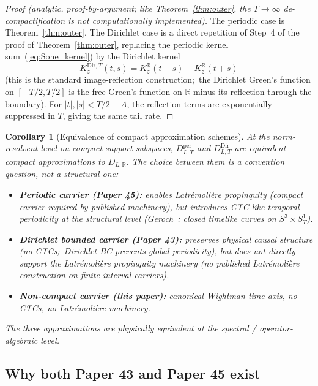 \documentclass[11pt,a4paper]{article}
\theoremstyle{plain}
\newtheorem{corollary}[theorem]{Corollary}
\theoremstyle{definition}
\newcommand{\sthree}{S^{3}}
\newcommand{\SoneT}{S^{1}_{T}}
\newcommand{\R}{\mathbb{R}}
\newcommand{\DLR}{D_{L,\R}}
\begin{document}
\begin{proof}[Proof (analytic, proof-by-argument; like
Theorem~\ref{thm:outer}, the $T\to\infty$ de-compactification is not
computationally implemented)]
The periodic case is Theorem~\ref{thm:outer}. The Dirichlet case is a
direct repetition of Step~4 of the proof of Theorem~\ref{thm:outer},
replacing the periodic kernel sum~(\ref{eq:Sone_kernel}) by the
Dirichlet kernel
\[
K_{z}^{\mathrm{Dir}, T}(t, s)
= K_{z}^{\R}(t - s) - K_{z}^{\R}(t + s)
\]
(this is the standard image-reflection construction;\ the Dirichlet
Green's function on $[-T/2, T/2]$ is the free Green's function on $\R$
minus its reflection through the boundary). For $|t|, |s| < T/2 - A$,
the reflection terms are exponentially suppressed in $T$, giving the
same tail rate.
\end{proof}

\begin{corollary}[Equivalence of compact approximation schemes]
\label{cor:compact_equivalent}
At the norm-resolvent level on compact-support subspaces,
$D^{\mathrm{per}}_{L,T}$ and $D^{\mathrm{Dir}}_{L,T}$ are equivalent
compact approximations to $\DLR$. The choice between them is a
convention question, not a structural one:\
\begin{itemize}
\item \textbf{Periodic carrier (Paper 45):} enables Latr\'emoli\`ere
propinquity (compact carrier required by published machinery), but
introduces CTC-like temporal periodicity at the structural level
(Geroch~\cite{geroch1967}: closed timelike curves on
$\sthree \times \SoneT$).
\item \textbf{Dirichlet bounded carrier (Paper 43):} preserves
physical causal structure (no CTCs;\ Dirichlet BC prevents global
periodicity), but does not directly support the Latr\'emoli\`ere
propinquity machinery (no published Latr\'emoli\`ere construction on
finite-interval carriers).
\item \textbf{Non-compact carrier (this paper):} canonical Wightman
time axis, no CTCs, no Latr\'emoli\`ere machinery.
\end{itemize}
The three approximations are physically equivalent at the spectral /
operator-algebraic level.
\end{corollary}

\subsection{Why both Paper 43 and Paper 45 exist}\label{sec:p43_p45_explained}
\end{document}
